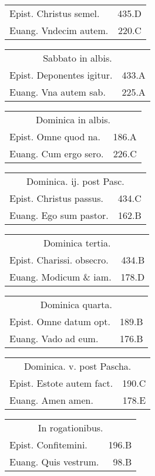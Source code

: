 \documentclass[a5paper,10pt]{book}
\begin{document}
\begin{multicols}{2}
\begin{tabular}{l r}
Epist. Christus semel. & 435.D\\
Euang. Vndecim autem. & 220.C\\
\end{tabular}
\begin{tabular}{l r}
\multicolumn{2}{c}{\color{red} Sabbato in albis.}\\
Epist. Deponentes igitur. & 433.A\\
Euang. Vna autem sab. & 225.A\\
\end{tabular}
\begin{tabular}{l r}
\multicolumn{2}{c}{\color{red} Dominica in albis.}\\
Epist. Omne quod na. & 186.A\\
Euang. Cum ergo sero. & 226.C\\
\end{tabular}
\begin{tabular}{l r}
\multicolumn{2}{c}{\color{red} Dominica. ij. post Pasc.}\\
Epist. Christus passus. & 434.C\\
Euang. Ego sum pastor. & 162.B\\
\end{tabular}
\begin{tabular}{l r}
\multicolumn{2}{c}{\color{red} Dominica tertia.}\\
Epist. Charissi. obsecro. & 434.B\\
Euang. Modicum \& iam. & 178.D\\
\end{tabular}
\begin{tabular}{l r}
\multicolumn{2}{c}{\color{red} Dominica quarta.}\\
Epist. Omne datum opt. & 189.B\\
Euang. Vado ad eum. & 176.B\\
\end{tabular}
\begin{tabular}{l r}
\multicolumn{2}{c}{\color{red} Dominica. v. post Pascha.}\\
Epist. Estote autem fact. & 190.C\\
Euang. Amen amen. & 178.E\\
\end{tabular}
\begin{tabular}{l r}
\multicolumn{2}{c}{\color{red} In rogationibus.}\\
Epist. Confitemini. & 196.B\\
Euang. Quis vestrum. & 98.B\\

\end{tabular}
\end{multicols}
\end{document}
